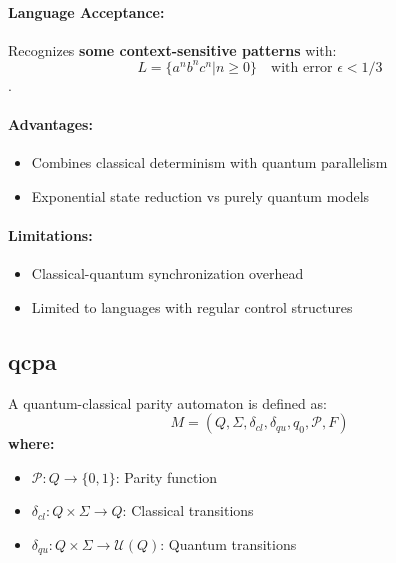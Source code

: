 \paragraph{Language Acceptance:}
Recognizes \textbf{some context-sensitive patterns} with:
\[ L = \{a^nb^nc^n | n \geq 0\} \quad \text{with error } \epsilon < 1/3 \]\cite{zheng2012two, gruska2005}.

\paragraph{Advantages:}
\begin{itemize}
    \item Combines classical determinism with quantum parallelism
    \item Exponential state reduction vs purely quantum models
\end{itemize}

\paragraph{Limitations:}
\begin{itemize}
    \item Classical-quantum synchronization overhead
    \item Limited to languages with regular control structures
\end{itemize}

\subsection{\acrfull{qcpa}}
\label{subsec:qcpa}

\begin{definition}
A quantum-classical parity automaton is defined as:
\[
M = (Q, \Sigma, \delta_{cl}, \delta_{qu}, q_0, \mathcal{P}, F)
\]
\textbf{where:}
\begin{itemize}
    \item $\mathcal{P}: Q \rightarrow \{0,1\}$: Parity function
    \item $\delta_{cl}: Q \times \Sigma \rightarrow Q$: Classical transitions
    \item $\delta_{qu}: Q \times \Sigma \rightarrow \mathcal{U}(Q)$: Quantum transitions
\end{itemize}
\end{definition}

